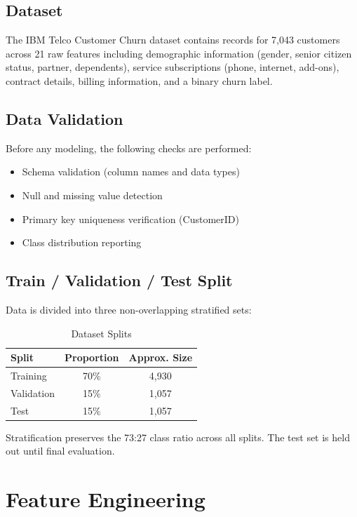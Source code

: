 \documentclass[conference]{IEEEtran}
\begin{document}
\subsection{Dataset}

The IBM Telco Customer Churn dataset contains records for 7,043 customers across 21 raw features including demographic information (gender, senior citizen status, partner, dependents), service subscriptions (phone, internet, add-ons), contract details, billing information, and a binary churn label.

\subsection{Data Validation}

Before any modeling, the following checks are performed:
\begin{itemize}
    \item Schema validation (column names and data types)
    \item Null and missing value detection
    \item Primary key uniqueness verification (CustomerID)
    \item Class distribution reporting
\end{itemize}

\subsection{Train / Validation / Test Split}

Data is divided into three non-overlapping stratified sets:

\begin{table}[h]
\centering
\caption{Dataset Splits}
\begin{tabular}{lcc}
\toprule
\textbf{Split} & \textbf{Proportion} & \textbf{Approx. Size} \\
\midrule
Training & 70\% & 4,930 \\
Validation & 15\% & 1,057 \\
Test & 15\% & 1,057 \\
\bottomrule
\end{tabular}
\end{table}

Stratification preserves the 73:27 class ratio across all splits. The test set is held out until final evaluation.

\section{Feature Engineering}
\end{document}
